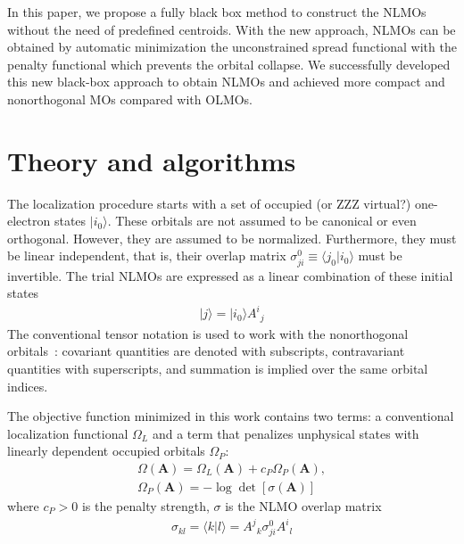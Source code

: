 \documentclass[aps,prl,reprint,amsmath,amssymb]{revtex4-1}
\newcommand{\ket}[1]{\ensuremath{\vert #1 \rangle}}
\newcommand{\braket}[2]{\ensuremath{\langle #1 \vert #2 \rangle}} %
\begin{document}
In this paper, we propose a fully black box method to construct the NLMOs without the need of predefined centroids.
With the new approach, NLMOs can be obtained by automatic minimization the unconstrained spread functional with the  penalty functional which prevents the orbital collapse.
We successfully developed this new black-box approach to obtain NLMOs and achieved more compact and nonorthogonal MOs compared with OLMOs.

\section{Theory and algorithms}

The localization procedure starts with a set of occupied (or ZZZ virtual?) one-electron states $\ket{i_0}$. 
These orbitals are not assumed to be canonical or even orthogonal. 
However, they are assumed to be normalized. 
Furthermore, they must be linear independent, that is, their overlap matrix $\sigma_{ji}^0 \equiv \braket{j_0}{i_0}$ must be invertible. 
The trial NLMOs are expressed as a linear combination of these initial states
%
\begin{equation}
\begin{split}
\ket{j} = \ket{i_0} {A^i}_j  
\end{split}
\end{equation}
%
The conventional tensor notation is used to work with the nonorthogonal orbitals~\cite{head1998tensor}: covariant quantities are denoted with subscripts, contravariant quantities with superscripts, and summation is implied over the same orbital indices.

The objective function minimized in this work contains two terms: a conventional localization functional $\Omega_L$ and a term that penalizes unphysical states with linearly dependent occupied orbitals $\Omega_P$:
%
\begin{equation} \label{eq:fun-pen}
\begin{split}
\Omega(\mathbf{A}) = \Omega_L(\mathbf{A}) + c_P \Omega_P(\mathbf{A}), \\
\Omega_P(\mathbf{A}) = - \log \det \left[ \sigma (\mathbf{A}) \right]
\end{split}
\end{equation}
%
where $c_P > 0$ is the penalty strength, $\sigma$ is the NLMO overlap matrix 
%
\begin{equation}
\begin{split}
\sigma_{kl} = \braket{k}{l} = {A^j}_k \sigma_{ji}^0{A^i}_l
\end{split}
\end{equation}
%
\end{document}

